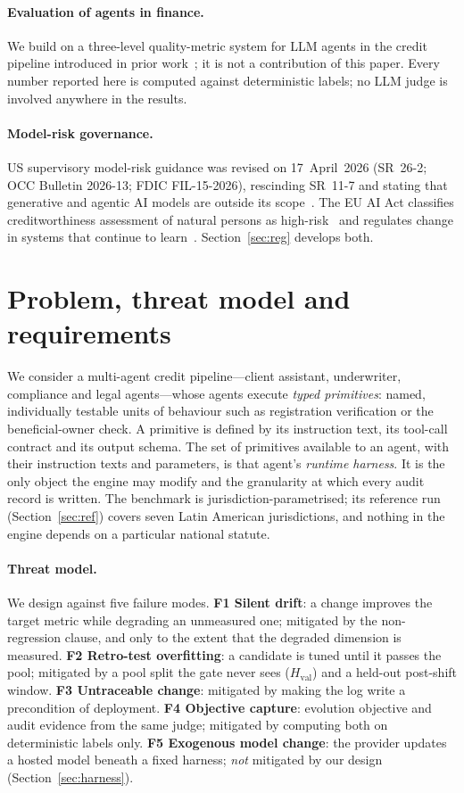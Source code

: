 \documentclass[11pt]{article}
\newcommand{\Hval}{H_{\mathrm{val}}}
\begin{document}
\paragraph{Evaluation of agents in finance.} We build on a three-level quality-metric system for LLM agents in the credit pipeline introduced in prior work~\cite{akhtyamov2026metrics}; it is not a contribution of this paper. Every number reported here is computed against deterministic labels; no LLM judge is involved anywhere in the results.

\paragraph{Model-risk governance.} US supervisory model-risk guidance was revised on 17~April~2026 (SR~26-2; OCC Bulletin 2026-13; FDIC FIL-15-2026), rescinding SR~11-7 and stating that generative and agentic AI models are outside its scope~\cite{sr262,occ202613}. The EU AI Act classifies creditworthiness assessment of natural persons as high-risk~\cite[Annex~III, point~5(b)]{euaiact} and regulates change in systems that continue to learn~\cite[Art.~43(4)]{euaiact}. Section~\ref{sec:reg} develops both.

\section{Problem, threat model and requirements}
\label{sec:problem}

We consider a multi-agent credit pipeline---client assistant, underwriter, compliance and legal agents---whose agents execute \emph{typed primitives}: named, individually testable units of behaviour such as registration verification or the beneficial-owner check. A primitive is defined by its instruction text, its tool-call contract and its output schema. The set of primitives available to an agent, with their instruction texts and parameters, is that agent's \emph{runtime harness}. It is the only object the engine may modify and the granularity at which every audit record is written. The benchmark is jurisdiction-parametrised; its reference run (Section~\ref{sec:ref}) covers seven Latin American jurisdictions, and nothing in the engine depends on a particular national statute.

\paragraph{Threat model.} We design against five failure modes.
\textbf{F1 Silent drift}: a change improves the target metric while degrading an unmeasured one; mitigated by the non-regression clause, and only to the extent that the degraded dimension is measured.
\textbf{F2 Retro-test overfitting}: a candidate is tuned until it passes the pool; mitigated by a pool split the gate never sees ($\Hval$) and a held-out post-shift window.
\textbf{F3 Untraceable change}: mitigated by making the log write a precondition of deployment.
\textbf{F4 Objective capture}: evolution objective and audit evidence from the same judge; mitigated by computing both on deterministic labels only.
\textbf{F5 Exogenous model change}: the provider updates a hosted model beneath a fixed harness; \emph{not} mitigated by our design (Section~\ref{sec:harness}).
\end{document}
